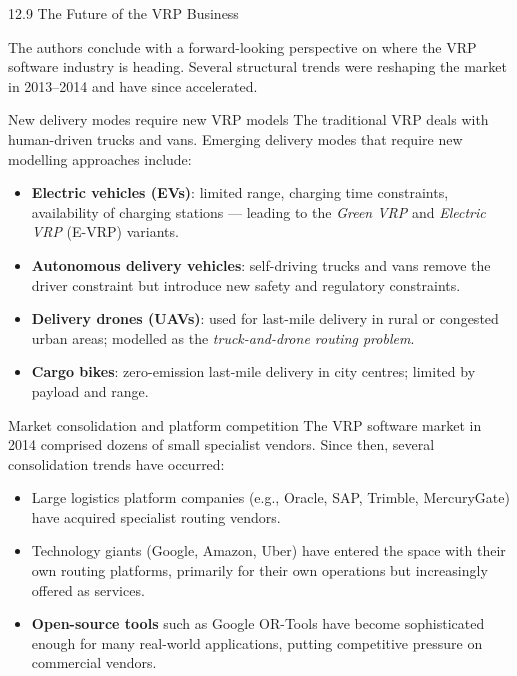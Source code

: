\documentclass[aspectratio=169,10pt]{beamer}
\begin{document}
\begin{frame}[allowframebreaks]{12.9 \; The Future of the VRP Business}

  The authors conclude with a forward-looking perspective on where the
  VRP software industry is heading.
  Several structural trends were reshaping the market in 2013--2014 and
  have since accelerated.

  \begin{block}{New delivery modes require new VRP models}
    The traditional VRP deals with human-driven trucks and vans.
    Emerging delivery modes that require new modelling approaches include:
    \begin{itemize}
      \item \textbf{Electric vehicles (EVs)}: limited range, charging time
            constraints, availability of charging stations --- leading to
            the \emph{Green VRP} and \emph{Electric VRP} (E-VRP) variants.
      \item \textbf{Autonomous delivery vehicles}: self-driving trucks and
            vans remove the driver constraint but introduce new safety and
            regulatory constraints.
      \item \textbf{Delivery drones (UAVs)}: used for last-mile delivery
            in rural or congested urban areas; modelled as the
            \emph{truck-and-drone routing problem}.
      \item \textbf{Cargo bikes}: zero-emission last-mile delivery in
            city centres; limited by payload and range.
    \end{itemize}
  \end{block}

  \framebreak

  \begin{block}{Market consolidation and platform competition}
    The VRP software market in 2014 comprised dozens of small specialist
    vendors.
    Since then, several consolidation trends have occurred:
    \begin{itemize}
      \item Large logistics platform companies (e.g., Oracle, SAP,
            Trimble, MercuryGate) have acquired specialist routing vendors.
      \item Technology giants (Google, Amazon, Uber) have entered the
            space with their own routing platforms, primarily for
            their own operations but increasingly offered as services.
      \item \textbf{Open-source tools} such as Google OR-Tools have
            become sophisticated enough for many real-world applications,
            putting competitive pressure on commercial vendors.
    \end{itemize}
  \end{block}


\end{frame}
\end{document}
